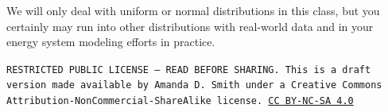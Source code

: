 \documentclass[10pt]{article}
\begin{document}


We will only deal with uniform or normal distributions in this class, but you certainly may run into other distributions with real-world data and in your energy system modeling efforts in practice.

\bigskip

\noindent
\texttt{\footnotesize RESTRICTED PUBLIC LICENSE --- READ BEFORE SHARING. This is a draft version made available by Amanda D. Smith under a Creative Commons Attribution-NonCommercial-ShareAlike license. 
\href{https://creativecommons.org/licenses/by-nc-sa/4.0/}{CC BY-NC-SA 4.0}}

\printbibliography
\end{document}
